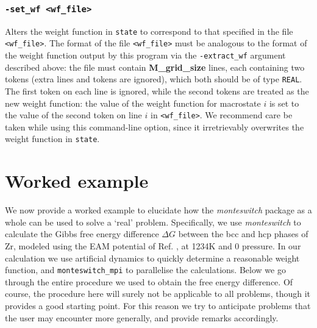 \documentclass{report}
\begin{document}
\subsection{\texttt{-set\_wf <wf\_file>}}
Alters the weight function in \texttt{state} to correspond to that specified in the file \texttt{<wf\_file>}. The format of the file
\texttt{<wf\_file>} must be analogous to the format of the weight function output by this program via the \texttt{-extract\_wf} argument
described above: the file must contain \textbf{M\_grid\_size} lines, each containing two tokens (extra lines and tokens are ignored),
which both should be of type \texttt{REAL}. The first token on each line is ignored, while the second tokens are treated as the new
weight function: the value of the weight function for macrostate $i$ is set to the value of the second token on line $i$ in
\texttt{<wf\_file>}. We recommend care be taken while using this command-line option, since it irretrievably overwrites the weight 
function in \texttt{state}.


\chapter{Worked example}\label{chapter:example}
We now provide a worked example to elucidate how the \emph{monteswitch} package as a whole can be used to solve a `real' problem.
Specifically, we use \emph{monteswitch} to calculate the Gibbs free energy difference $\Delta G$ between the bcc and hcp
phases of Zr, modeled using the EAM potential of Ref. \cite{Mendelev_2007}, at 1234K and 0 pressure. 
In our calculation we use artificial dynamics to quickly determine a reasonable weight function, and \texttt{monteswitch\_mpi} to
parallelise the calculations. Below we go through the entire procedure we used to obtain the free energy
difference. Of course, the procedure here will surely not be applicable to all problems, though it provides a good starting point. 
For this reason we try to anticipate problems that the user may encounter more generally, and provide remarks accordingly.
\end{document}
